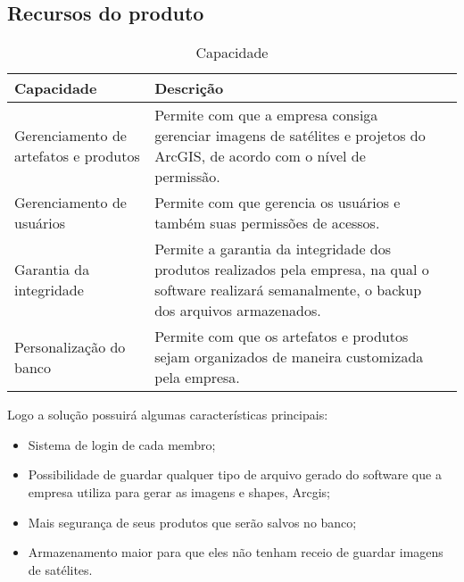 \subsection{Recursos do produto}
 \begin{table}[!htb]
    \centering
    \begin{tabular}{p{}p{6cm}p{6cm}} \hline
      \rowcolor{gray!50}
        \textbf{Capacidade}           & \textbf{Descrição}                                                           \\
      \hline
        Gerenciamento de artefatos e produtos    & Permite com que a empresa consiga gerenciar imagens de satélites e projetos do ArcGIS, de acordo com o nível de permissão.                                                              \\
        Gerenciamento de usuários  & Permite com que gerencia os usuários e também suas permissões de acessos.                                                                \\
        Garantia da integridade    & Permite a garantia da integridade dos produtos realizados pela empresa, na qual o software realizará semanalmente, o backup dos arquivos armazenados.
                                                                                \\
        Personalização do banco    & Permite com que os artefatos e produtos sejam organizados de maneira customizada pela empresa.                                       \\
                                                                                                                                              

                                                                                       
    \end{tabular}
    \caption{Capacidade}
  \end{table}


  Logo a solução possuirá algumas características principais:

  \begin{itemize}
    \item Sistema de login de cada membro;
    \item Possibilidade de guardar qualquer tipo de arquivo gerado do software que a empresa utiliza para gerar as imagens e shapes, Arcgis;
    \item Mais segurança de seus produtos que serão salvos no banco;
    \item Armazenamento maior para que eles não tenham receio de guardar imagens de satélites.
  \end{itemize}



